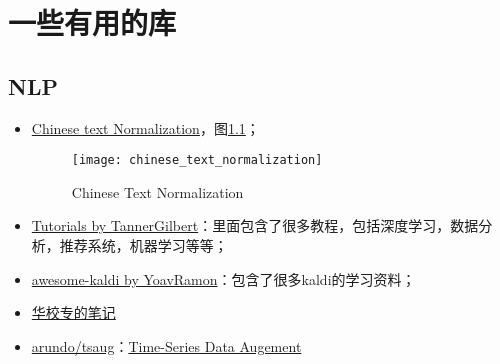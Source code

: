 \chapter{一些有用的库}

\section{NLP}
\begin{itemize}
	\item \href{https://github.com/speech-io/chinese_text_normalization.git}{Chinese text Normalization}，图\ref{fig:chinese_text_normalization}；
		\begin{figure}[htbp]
		  \centering
		  \texttt{[image: chinese\_text\_normalization]}
		  \caption{Chinese Text Normalization \label{fig:chinese_text_normalization}}
		\end{figure}
	\item \href{https://github.com/TannerGilbert/Tutorials.git}{Tutorials by TannerGilbert}：里面包含了很多教程，包括深度学习，数据分析，推荐系统，机器学习等等；
	\item \href{https://github.com/YoavRamon/awesome-kaldi.git}{awesome-kaldi by YoavRamon}：包含了很多kaldi的学习资料；
	\item \href{http://www.huaxiaozhuan.com/}{华校专的笔记}
	\item \href{https://github.com/arundo/tsaug.git}{arundo/tsaug}：\href{https://arundo-tsaug.readthedocs-hosted.com/en/latest/}{Time-Series Data Augement}
\end{itemize}
